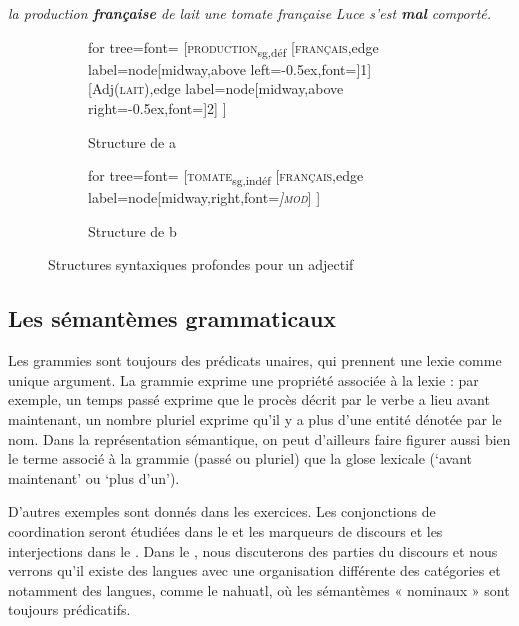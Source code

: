 \ea\label{ex:13-francais}
\ea \textit{la production \textbf{française} de lait}
\ex \textit{une tomate française}
\ex \textit{Luce s’est \textbf{mal} comporté.}\z\z

\begin{figure}
	\begin{subfigure}[b]{0.5\textwidth}
		\centering
		\begin{forest} for tree={font=\normalfont}
			[\textsc{production}\textsubscript{sg,déf}
			[\textsc{français},edge label={node[midway,above left=-0.5ex,font=\footnotesize]{1}}]
			[Adj(\textsc{lait}),edge label={node[midway,above right=-0.5ex,font=\footnotesize]{2}}]
			]
		\end{forest}
		\caption{Structure de a}
	\end{subfigure}%
	\hfill
	\begin{subfigure}[b]{0.5\textwidth}
		\centering
		\begin{forest} for tree={font=\normalfont}
			[\textsc{tomate}\textsubscript{sg,indéf}
			[\textsc{français},edge label={node[midway,right,font=\footnotesize\itshape]{\textsc{mod}}}]
			]
		\end{forest}
		\caption{Structure de b}
	\end{subfigure}
\caption{Structures syntaxiques profondes pour un adjectif\label{fig:13-francais}}
\end{figure}

\subsection{Les sémantèmes grammaticaux} 
Les grammies sont toujours des prédicats unaires, qui prennent une lexie com\-me unique argument. La grammie exprime une propriété associée à la lexie : par exemple, un temps passé exprime que le procès décrit par le verbe a lieu avant maintenant, un nombre pluriel exprime qu’il y a plus d’une entité dénotée par le nom. Dans la représentation sémantique, on peut d’ailleurs faire figurer aussi bien le terme associé à la grammie (passé ou pluriel) que la glose lexicale (‘avant maintenant’ ou ‘plus d’un’).

D’autres exemples sont donnés dans les exercices. Les conjonctions de coordination seront étudiées dans le  et les marqueurs de discours et les interjections dans le . Dans le , nous discuterons des parties du discours et nous verrons qu’il existe des langues avec une organisation différente des catégories et notamment des langues, comme le nahuatl, où les sémantèmes « nominaux » sont toujours prédicatifs.

